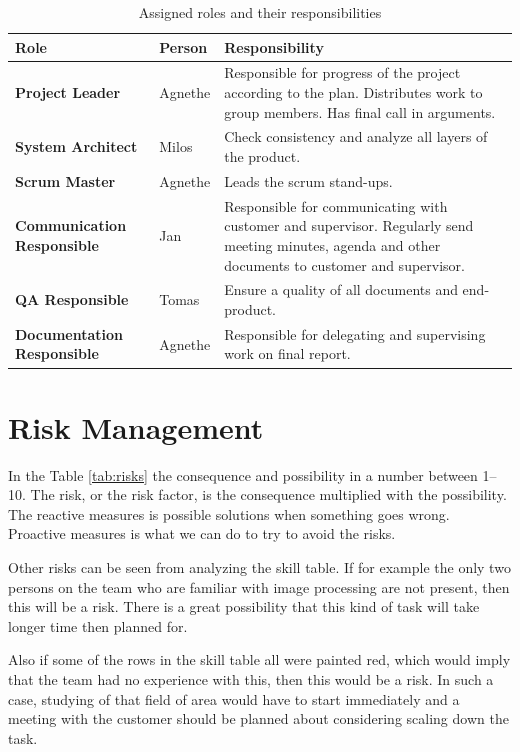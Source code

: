 \begin{table}\centering {}
    \caption{Assigned roles and their responsibilities}
    \label{tab:roles}
    \vspace{2mm}
    \begin{tabularx}{\textwidth}{llX}
    \toprule[0.5mm]
    Role    & Person   & Responsibility \\
    \midrule
    \textbf{Project Leader}             & Agnethe &
        Responsible for progress of the project according to the plan.
        Distributes work to group members.
        Has final call in arguments.\\
    \textbf{System Architect}             & Milos &
        Check consistency and analyze all layers of the product. \\
    \textbf{Scrum Master}             & Agnethe &
        Leads the scrum stand-ups. \\
    \textbf{Communication Responsible}  & Jan &
        Responsible for communicating with customer and supervisor.
        Regularly send meeting minutes, agenda and other documents to customer and supervisor. \\ 
    \textbf{QA Responsible} & Tomas &
        Ensure a quality of all documents and end-product.        \\ 
    \textbf{Documentation Responsible} & Agnethe &
        Responsible for delegating and supervising work on final report.        \\         
    \bottomrule[0.5mm]
    \end{tabularx}
\end{table}

\section{Risk Management}
In the Table \ref{tab:risks} the consequence and possibility in a number between 1--10. The risk, or the risk factor, is the consequence multiplied with the possibility. The reactive measures is possible solutions when something goes wrong. Proactive measures is what we can do to try to avoid the risks.  

Other risks can be seen from analyzing the skill table. If for example the only two persons on the team who are familiar with image processing are not present, then this will be a risk. There is a great possibility that this kind of task will take longer time then planned for. 

Also if some of the rows in the skill table all were painted red, which  would imply that the team had no experience with this, then this would be a risk. 
In such a case, studying of that field of area would have to start immediately and a meeting with the customer should be planned about considering scaling down the task.

